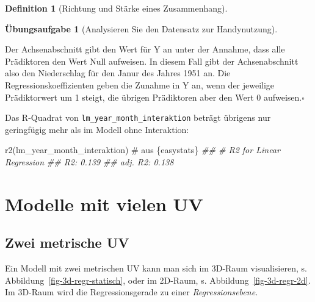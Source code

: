 \documentclass[
  a4paper,
  DIV=11]{scrreprt}
\newenvironment{Shaded}{\begin{snugshade}}{\end{snugshade}}
\newcommand{\CommentTok}[1]{\textcolor[rgb]{0.37,0.37,0.37}{#1}}
\newcommand{\DocumentationTok}[1]{\textcolor[rgb]{0.37,0.37,0.37}{\textit{#1}}}
\newcommand{\FunctionTok}[1]{\textcolor[rgb]{0.28,0.35,0.67}{#1}}
\newcommand{\NormalTok}[1]{\textcolor[rgb]{0.00,0.23,0.31}{#1}}
\theoremstyle{definition}
\newtheorem{exercise}{Übungsaufgabe}[chapter]
\theoremstyle{definition}
\theoremstyle{definition}
\newtheorem{definition}{Definition}[chapter]
\theoremstyle{remark}
\begin{document}
\begin{definition}[Richtung und Stärke eines
Zusammenhang]
\begin{exercise}[Analysieren Sie den Datensatz zur
Handynutzung]
\begin{tcolorbox}
Der Achsenabschnitt gibt den Wert für Y an unter der Annahme, dass alle
Prädiktoren den Wert Null aufweisen. In diesem Fall gibt der
Achsenabschnitt also den Niederschlag für den Janur des Jahres 1951 an.
Die Regressionskoeffizienten geben die Zunahme in Y an, wenn der
jeweilige Prädiktorwert um 1 steigt, die übrigen Prädiktoren aber den
Wert 0 aufweisen.\(\square\)

\end{tcolorbox}

Das R-Quadrat von \texttt{lm\_year\_month\_interaktion} beträgt übrigens
nur geringfügig mehr als im Modell ohne Interaktion:

\begin{Shaded}
\begin{Highlighting}[]
\FunctionTok{r2}\NormalTok{(lm\_year\_month\_interaktion)  }\CommentTok{\# aus \textasciigrave{}\{easystats\}\textasciigrave{}}
\DocumentationTok{\#\# \# R2 for Linear Regression}
\DocumentationTok{\#\#        R2: 0.139}
\DocumentationTok{\#\#   adj. R2: 0.138}
\end{Highlighting}
\end{Shaded}

\section{Modelle mit vielen UV}\label{modelle-mit-vielen-uv}

\subsection{Zwei metrische UV}\label{zwei-metrische-uv}

Ein Modell mit zwei metrischen UV kann man sich im 3D-Raum
visualisieren, s. Abbildung~\ref{fig-3d-regr-statisch}, oder im 2D-Raum,
s. Abbildung~\ref{fig-3d-regr-2d}. Im 3D-Raum wird die Regressionsgerade
zu einer \emph{Regressionsebene.}

\begin{figure}

\begin{minipage}{0.33\linewidth}


\end{minipage}
\end{figure}
\end{exercise}
\end{definition}
\end{document}
